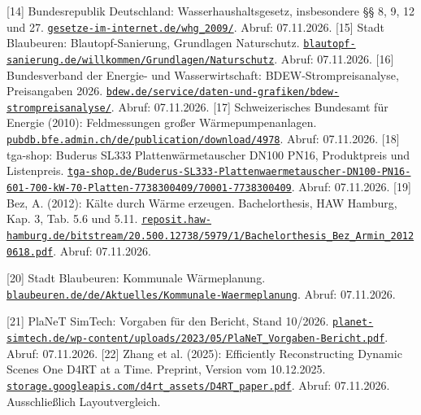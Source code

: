 \begin{description}[leftmargin=8mm,labelsep=2mm]
 [14] Bundesrepublik Deutschland: Wasserhaushaltsgesetz, insbesondere §§ 8, 9, 12 und 27. \href{https://www.gesetze-im-internet.de/whg_2009/}{\nolinkurl{gesetze-im-internet.de/whg_2009/}}. Abruf: 07.11.2026.
 [15] Stadt Blaubeuren: Blautopf-Sanierung, Grundlagen Naturschutz. \href{https://www.blautopf-sanierung.de/willkommen/Grundlagen/Naturschutz}{\nolinkurl{blautopf-sanierung.de/willkommen/Grundlagen/Naturschutz}}. Abruf: 07.11.2026.
 [16] Bundesverband der Energie- und Wasserwirtschaft: BDEW-Strompreisanalyse, Preisangaben 2026. \href{https://www.bdew.de/service/daten-und-grafiken/bdew-strompreisanalyse/}{\nolinkurl{bdew.de/service/daten-und-grafiken/bdew-strompreisanalyse/}}. Abruf: 07.11.2026.
 [17] Schweizerisches Bundesamt für Energie (2010): Feldmessungen großer Wärmepumpenanlagen. \href{https://pubdb.bfe.admin.ch/de/publication/download/4978}{\nolinkurl{pubdb.bfe.admin.ch/de/publication/download/4978}}. Abruf: 07.11.2026.
 [18] tga-shop: Buderus SL333 Plattenwärmetauscher DN100 PN16, Produktpreis und Listenpreis. \href{https://tga-shop.de/Buderus-SL333-Plattenwaermetauscher-DN100-PN16-601-700-kW-70-Platten-7738300409/70001-7738300409}{\nolinkurl{tga-shop.de/Buderus-SL333-Plattenwaermetauscher-DN100-PN16-601-700-kW-70-Platten-7738300409/70001-7738300409}}. Abruf: 07.11.2026.
 [19] \begingroup{} Bez, A. (2012): Kälte durch Wärme erzeugen. Bachelorthesis, HAW Hamburg, Kap. 3, Tab. 5.6 und 5.11. \href{https://reposit.haw-hamburg.de/bitstream/20.500.12738/5979/1/Bachelorthesis_Bez_Armin_20120618.pdf}{\nolinkurl{reposit.haw-hamburg.de/bitstream/20.500.12738/5979/1/Bachelorthesis_Bez_Armin_20120618.pdf}}. Abruf: 07.11.2026.\par\endgroup
{} [20] \begingroup{} Stadt Blaubeuren: Kommunale Wärmeplanung. \href{https://www.blaubeuren.de/de/Aktuelles/Kommunale-Waermeplanung}{\nolinkurl{blaubeuren.de/de/Aktuelles/Kommunale-Waermeplanung}}. Abruf: 07.11.2026.\par\endgroup
{} [21] PlaNeT SimTech: Vorgaben für den Bericht, Stand 10/2026. \href{https://www.planet-simtech.de/wp-content/uploads/2023/05/PlaNeT_Vorgaben-Bericht.pdf}{\nolinkurl{planet-simtech.de/wp-content/uploads/2023/05/PlaNeT_Vorgaben-Bericht.pdf}}. Abruf: 07.11.2026.
 [22] Zhang et al. (2025): Efficiently Reconstructing Dynamic Scenes One D4RT at a Time. Preprint, Version vom 10.12.2025. \href{https://storage.googleapis.com/d4rt_assets/D4RT_paper.pdf}{\nolinkurl{storage.googleapis.com/d4rt_assets/D4RT_paper.pdf}}. Abruf: 07.11.2026. Ausschließlich Layoutvergleich.

\end{description}
